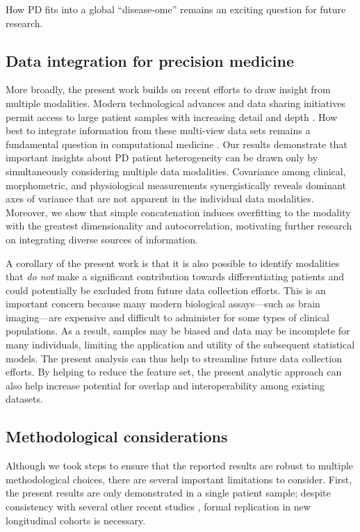 \documentclass[12pt,aps,pra,reprint,showkeys]{revtex4-1}
\begin{document}
How PD fits into a global ``disease-ome'' remains an exciting question for future research.

\subsection*{Data integration for precision medicine}

More broadly, the present work builds on recent efforts to draw insight from multiple modalities. 
Modern technological advances and data sharing initiatives permit access to large patient samples with increasing detail and depth \citep{marek2011progneurobiol}.
How best to integrate information from these multi-view data sets remains a fundamental question in computational medicine \citep{wang2014similarity, misic2016curropinneurobiol}.
Our results demonstrate that important insights about PD patient heterogeneity can be drawn only by simultaneously considering multiple data modalities.
Covariance among clinical, morphometric, and physiological measurements synergistically reveals dominant axes of variance that are not apparent in the individual data modalities.
Moreover, we show that simple concatenation induces overfitting to the modality with the greatest dimensionality and autocorrelation, motivating further research on integrating diverse sources of information.

A corollary of the present work is that it is also possible to identify modalities that \textit{do not} make a significant contribution towards differentiating patients and could potentially be excluded from future data collection efforts.
This is an important concern because many modern biological assays---such as brain imaging---are expensive and difficult to administer for some types of clinical populations.
As a result, samples may be biased and data may be incomplete for many individuals, limiting the application and utility of the subsequent statistical models.
The present analysis can thus help to streamline future data collection efforts.
By helping to reduce the feature set, the present analytic approach can also help increase potential for overlap and interoperability among existing datasets.

\subsection*{Methodological considerations}

Although we took steps to ensure that the reported results are robust to multiple methodological choices, there are several important limitations to consider. 
First, the present results are only demonstrated in a single patient sample; despite consistency with several other recent studies \citep{sandor2019biorxiv}, formal replication in new longitudinal cohorts is necessary.
\end{document}
